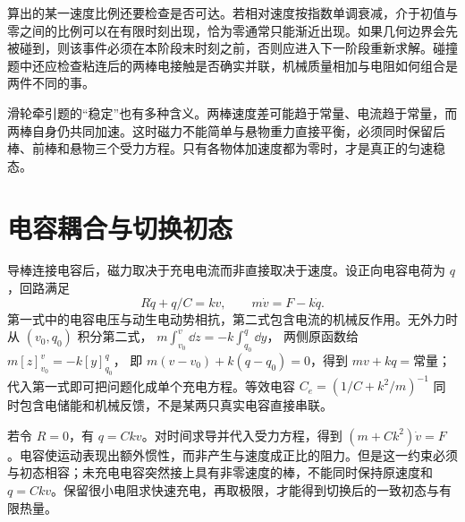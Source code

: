 算出的某一速度比例还要检查是否可达。若相对速度按指数单调衰减，介于初值与零之间的比例可以在有限时刻出现，恰为零通常只能渐近出现。如果几何边界会先被碰到，则该事件必须在本阶段末时刻之前，否则应进入下一阶段重新求解。碰撞题中还应检查粘连后的两棒电接触是否确实并联，机械质量相加与电阻如何组合是两件不同的事。


滑轮牵引题的“稳定”也有多种含义。两棒速度差可能趋于常量、电流趋于常量，而两棒自身仍共同加速。这时磁力不能简单与悬物重力直接平衡，必须同时保留后棒、前棒和悬物三个受力方程。只有各物体加速度都为零时，才是真正的匀速稳态。



\section{电容耦合与切换初态}



导棒连接电容后，磁力取决于充电电流而非直接取决于速度。设正向电容电荷为 $q$，回路满足
\[R\dot q+q/C=kv,\qquad m\dot v=F-k\dot q.\]
第一式中的电容电压与动生电动势相抗，第二式包含电流的机械反作用。无外力时从 $(v_0,q_0)$ 积分第二式，
$m\int_{v_0}^{v}\dd z=-k\int_{q_0}^{q}\dd y$，
两侧原函数给 $m[z]_{v_0}^{v}=-k[y]_{q_0}^{q}$，
即 $m(v-v_0)+k(q-q_0)=0$，得到 $mv+kq=\text{常量}$；代入第一式即可把问题化成单个充电方程。等效电容 $C_e=(1/C+k^2/m)^{-1}$ 同时包含电储能和机械反馈，不是某两只真实电容直接串联。


若令 $R=0$，有 $q=Ckv$。对时间求导并代入受力方程，得到 $(m+Ck^2)\dot v=F$。电容使运动表现出额外惯性，而非产生与速度成正比的阻力。但是这一约束必须与初态相容；未充电电容突然接上具有非零速度的棒，不能同时保持原速度和 $q=Ckv$。保留很小电阻求快速充电，再取极限，才能得到切换后的一致初态与有限热量。


